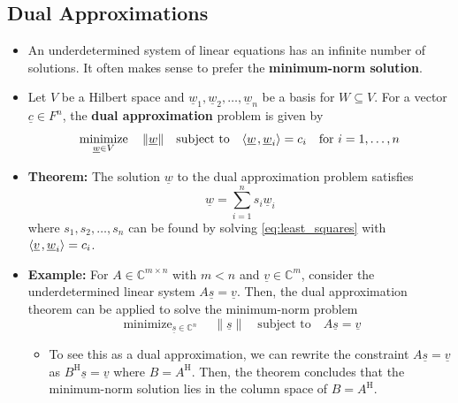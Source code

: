 \documentclass[11pt,twoside]{report}
\newcommand{\bbC}{{\mathbb{C}}}
\newcommand{\vecnot}{\underline}
\newcommand{\Herm}{{\mathrm{H}}}
\DeclareMathOperator*{\minimize}{minimize}
\newcommand{\inner}[2]{{\left\langle #1 \mskip2mu , #2 \right\rangle}}
\begin{document}
\subsection{Dual Approximations} 

\begin{itemize}

\item An underdetermined system of linear equations has an infinite number of solutions.
It often makes sense to prefer the \textbf{minimum-norm solution}.



\item Let $V$ be a Hilbert space and $\vecnot{w}_1 ,\vecnot{w}_2 , \ldots, \vecnot{w}_n$ be a basis for $W\subseteq V$.
For a vector $\vecnot{c} \in F^n$, the \textbf{dual approximation} problem is given by %
\[
\minimize_{\vecnot{w} \in  V  } \quad \| \vecnot{w} \| \quad \text{subject to} \quad \inner{ \vecnot{w} }{ \vecnot{w}_i } = c_i \quad \text{for $i = 1, \dots , n$}
\]

\item \textbf{Theorem:} 
The solution $\vecnot{w}$ to the dual approximation problem  satisfies 
\[ \vecnot{w} = \sum_{i=1}^n s_i \vecnot{w}_i %
  \]
where $s_1,s_2,\ldots,s_n$ can be found by solving \eqref{eq:least_squares} with $\inner{ \vecnot{v} }{ \vecnot{w}_i } = c_i$.

\item \textbf{Example: } For $A \in \mathbb{C}^{m\times n}$ with $m<n$ and $\vecnot{v} \in \mathbb{C}^m$, consider the underdetermined linear system $A \vecnot{s} = \vecnot{v}$.
Then, the dual approximation theorem can be applied to solve the minimum-norm problem
\[%
\minimize_{\vecnot{s} \in  \bbC^n  } \quad  \| \vecnot{s}\| \quad \text{subject to} \quad A\vecnot{s} = \vecnot{v}
 \]


\begin{itemize} 
\item  To see this as a dual approximation, we can rewrite the constraint $A \vecnot{s} = \vecnot{v}$ as $B^\Herm \vecnot{s} = \vecnot{v}$ where $B = A^\Herm$.
Then, the theorem concludes that the minimum-norm solution lies in  the column space of $B=A^\Herm$.




\end{itemize}
\end{itemize}
\end{document}
